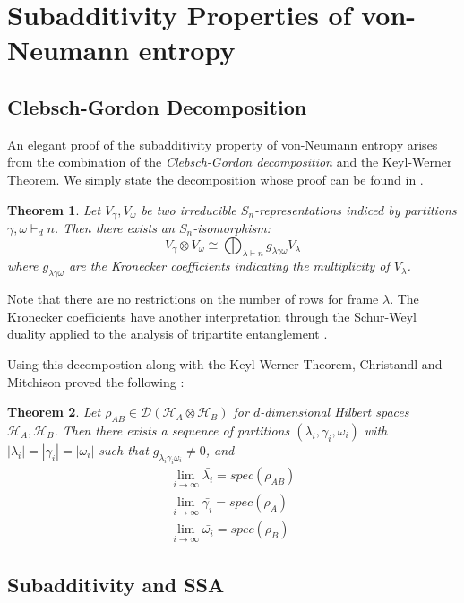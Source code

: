 \documentclass[11pt]{article}%
\newtheorem{thm}{Theorem}
\begin{document}
\section{Subadditivity Properties of von-Neumann entropy}

\subsection{Clebsch-Gordon Decomposition}
An elegant proof of the subadditivity property of von-Neumann entropy arises from the combination of the \textit{Clebsch-Gordon decomposition} and the Keyl-Werner Theorem. We simply state the decomposition whose proof can be found in \cite{FH}.

\begin{thm}
  Let $V_{\gamma}, V_{\omega}$ be two irreducible $S_n$-representations indiced by partitions $\gamma,\omega \vdash_d n$. Then there exists an $S_n$-isomorphism:
  $$ V_{\gamma} \otimes V_{\omega} \cong \bigoplus_{\lambda \vdash n} g_{\lambda\gamma\omega} V_{\lambda}$$ where $g_{\lambda\gamma\omega}$ are the Kronecker coefficients indicating the multiplicity of $V_\lambda$.
\end{thm}
\noindent Note that there are no restrictions on the number of rows for frame $\lambda$. The Kronecker coefficients have another interpretation through the Schur-Weyl duality applied to the analysis of tripartite entanglement \cite{CSW}.

\noindent Using this decompostion along with the Keyl-Werner Theorem, Christandl and Mitchison proved the following \cite{CM}:

\begin{thm} \label{converge}
  Let $\rho_{AB} \in \mathcal{D}(\mathcal{H}_A \otimes \mathcal{H}_B)$ for $d$-dimensional Hilbert spaces $\mathcal{H}_A, \mathcal{H}_B$. Then there exists a sequence of partitions $(\lambda_i, \gamma_i, \omega_i)$ with $|\lambda_i| = |\gamma_i| = |\omega_i|$ such that $g_{\lambda_i\gamma_i\omega_i} \neq 0$, and
  \begin{gather*}
    \lim_{i \rightarrow \infty} \bar{\lambda_i} = spec(\rho_{AB}) \\
    \lim_{i \rightarrow \infty} \bar{\gamma_i} = spec(\rho_A) \\
    \lim_{i \rightarrow \infty} \bar{\omega_i} =  spec(\rho_B)
  \end{gather*}
\end{thm}
\subsection{Subadditivity and SSA}
\end{document}
